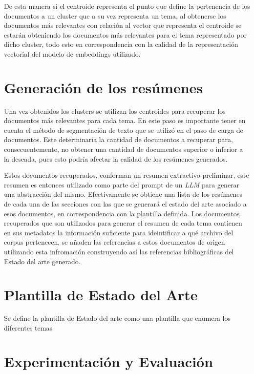     De esta manera si el centroide representa el punto que define la pertenencia de los documentos a un cluster que a su vez representa un tema, al obtenerse los documentos más relevantes con relación al vector que representa el centroide se estarán obteniendo los documentos más relevantes para el tema representado por dicho cluster, todo esto en correspondencia con la calidad de la representación vectorial del modelo de embeddings utilizado.
\section{Generación de los resúmenes}
    Una vez obtenidos los clusters se utilizan los centroides para recuperar los documentos más relevantes para cada tema. En este paso es importante tener en cuenta el método de segmentación de texto que se utilizó en el paso de carga de documentos. Este determinaría la cantidad de documentos a recuperar para, consecuentemente, no obtener una cantidad de documentos superior o inferior a la deseada, pues esto podría afectar la calidad de los resúmenes generados.
    
    Estos documentos recuperados, conforman un resumen extractivo preliminar, este resumen es entonces utilizado como parte del prompt de un \emph{LLM} para generar una abstracción del mismo. Efectivamente se obtiene una lista de los resúmenes de cada una de las secciones con las que se generará el estado del arte asociado a esos documentos, en correspondencia con la plantilla definida.
    Los documentos recuperados que son utilizados para generar el resumen de cada tema contienen en sus metadatos la información suficiente para ideintificar a qué archivo del corpus pertenecen, se añaden las referencias a estos documentos de origen utilizando esta infromación construyendo así las referencias bibliográficas del Estado del arte generado.

  

\section{Plantilla de Estado del Arte}
Se define la plantilla de Estado del arte como una plantilla que enumera los diferentes temas 
\section{Experimentación y Evaluación}